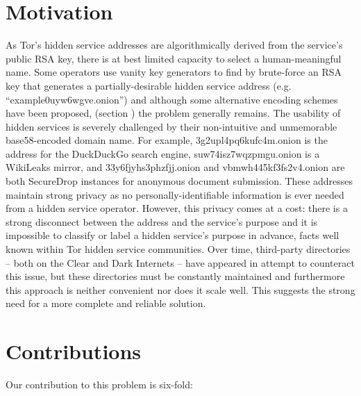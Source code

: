 \section{Motivation}
\label{sec:Motivation}

As Tor's hidden service addresses are algorithmically derived from the service's public RSA key, there is at best limited capacity to select a human-meaningful name. Some operators use vanity key generators to find by brute-force an RSA key that generates a partially-desirable hidden service address (e.g. ``example0uyw6wgve.onion'') and although some alternative encoding schemes have been proposed, (section \label{sec:EncodingSchemes}) the problem generally remains. The usability of hidden services is severely challenged by their non-intuitive and unmemorable base58-encoded domain name. For example, 3g2upl4pq6kufc4m.onion is the address for the DuckDuckGo search engine, suw74isz7wqzpmgu.onion is a WikiLeaks mirror, and 33y6fjyhs3phzfjj.onion and vbmwh445kf3fs2v4.onion are both SecureDrop instances for anonymous document submission. These addresses maintain strong privacy as no personally-identifiable information is ever needed from a hidden service operator. However, this privacy comes at a cost: there is a strong disconnect between the address and the service's purpose and it is impossible to classify or label a hidden service's purpose in advance, facts well known within Tor hidden service communities. Over time, third-party directories -- both on the Clear and Dark Internets -- have appeared in attempt to counteract this issue, but these directories must be constantly maintained and furthermore this approach is neither convenient nor does it scale well. This suggests the strong need for a more complete and reliable solution.

\section{Contributions}

Our contribution to this problem is six-fold:

